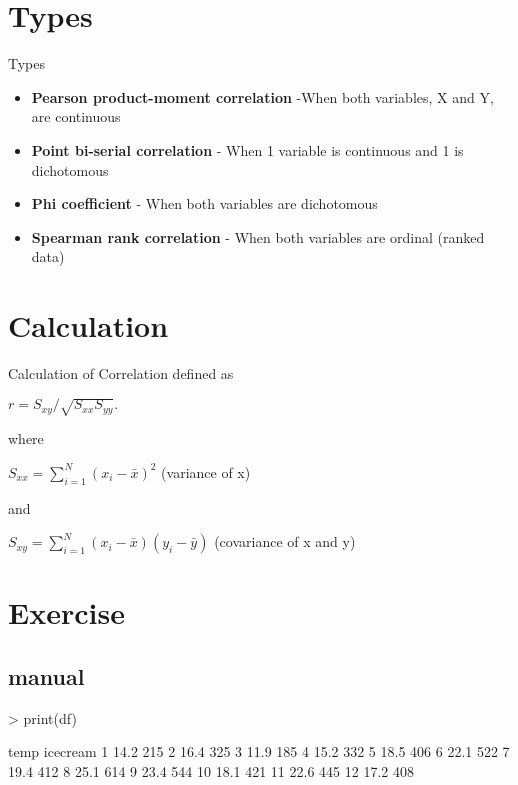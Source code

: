 \documentclass[slidestop,compress,14pt,xcolor=dvipsnames]{beamer}
\begin{document}
\section{Types}
\begin{frame}{Types}
\begin{itemize}
  \item {\bf Pearson product-moment correlation} -When both variables, X and Y, are continuous
  \item {\bf Point bi-serial correlation} - When 1 variable is continuous and 1 is dichotomous
  \item {\bf Phi coefficient} - When both variables are dichotomous
  \item {\bf Spearman rank correlation} - When both variables are ordinal (ranked data)
\end{itemize}
\end{frame}


\section{Calculation}
\begin{frame}{Calculation of Correlation}
defined as \newline 
\begin{center}
$r = S_{xy}/\sqrt{S_{xx}S_{yy}}.$ 
\end{center}
where 
\begin{center} $S_{xx} = \sum\limits_{i = 1}^N {\left( {x_i - \bar x} \right)^2}$ {(variance of x)} \end{center}
and
\begin{center} 
$S_{xy} = \sum\limits_{i = 1}^N {\left( {x_i - \bar x} \right)} {\left( {y_i - \bar y} \right)}$ {(covariance of x and y)}
\end{center}
\end{frame}


\section{Exercise}
\subsection{manual}

\begingroup
\fontsize{7pt}{9pt}\selectfont

\begin{Schunk}
\begin{Sinput}
> print(df)
\end{Sinput}
\begin{Soutput}
   temp icecream
1  14.2      215
2  16.4      325
3  11.9      185
4  15.2      332
5  18.5      406
6  22.1      522
7  19.4      412
8  25.1      614
9  23.4      544
10 18.1      421
11 22.6      445
12 17.2      408
\end{Soutput}
\end{Schunk}
\end{document}
